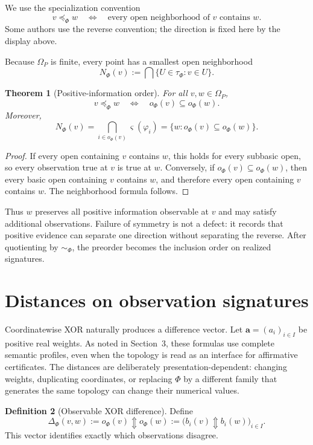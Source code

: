 \documentclass[11pt]{article}
\theoremstyle{definition}
\newtheorem{definition}{Definition}[section]
\theoremstyle{plain}
\newtheorem{theorem}[definition]{Theorem}
\theoremstyle{remark}
\begin{document}
We use the specialization convention
\[
 v\preceq_\Phi w
 \quad\Longleftrightarrow\quad
 \text{every open neighborhood of $v$ contains $w$}.
\]
Some authors use the reverse convention; the direction is fixed here by the
display above.

Because $\Omega_P$ is finite, every point has a smallest open neighborhood
\[
 N_\Phi(v):=\bigcap\{U\in\tau_\Phi:v\in U\}.
\]

\begin{theorem}[Positive-information order]
For all $v,w\in\Omega_P$,
\[
 v\preceq_\Phi w
 \quad\Longleftrightarrow\quad
 o_\Phi(v)\subseteq o_\Phi(w).
\]
Moreover,
\[
 N_\Phi(v)
 =\bigcap_{i\in o_\Phi(v)}\varsigma(\varphi_i)
 =\{w:o_\Phi(v)\subseteq o_\Phi(w)\}.
\]
\end{theorem}

\begin{proof}
If every open containing $v$ contains $w$, this holds for every subbasic open,
so every observation true at $v$ is true at $w$.  Conversely, if
$o_\Phi(v)\subseteq o_\Phi(w)$, then every basic open containing $v$ contains $w$,
and therefore every open containing $v$ contains $w$.  The neighborhood formula
follows.
\end{proof}

Thus $w$ preserves all positive information observable at $v$ and may satisfy
additional observations.  Failure of symmetry is not a defect: it records that
positive evidence can separate one direction without separating the reverse.
After quotienting by $\sim_\Phi$, the preorder becomes the inclusion order on
realized signatures.

\section{Distances on observation signatures}

Coordinatewise XOR naturally produces a difference vector.  Let
$\mathbf a=(a_i)_{i\in I}$ be positive real weights.  As noted in Section~3,
these formulas use complete semantic profiles, even when the topology is read as
an interface for affirmative certificates.  The distances are deliberately
presentation-dependent: changing weights, duplicating coordinates, or replacing
$\Phi$ by a different family that generates the same topology can change their
numerical values.

\begin{definition}[Observable XOR difference]
Define
\[
 \Delta_\Phi(v,w)
 :=o_\Phi(v)\Updownarrow o_\Phi(w)
 :=\bigl(b_i(v)\Updownarrow b_i(w)\bigr)_{i\in I}.
\]
This vector identifies exactly which observations disagree.
\end{definition}
\end{document}
